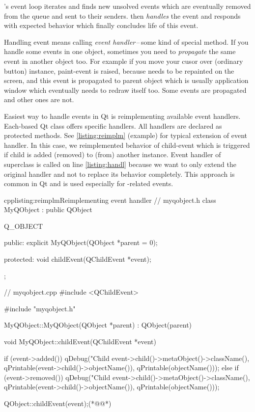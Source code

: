 \indent{}'s event loop iterates and finds new unsolved events which are eventually removed from the queue and sent to their senders. then \textit{handles} the event and responds with expected behavior which finally concludes life of this event.

Handling event means calling \textit{event handler}\,--\,some kind of special method. If you handle some events in one object, sometimes you need to \textit{propagate} the same event in another object too. For example if you move your cusor over (ordinary button) instance, paint-event is raised, because needs to be repainted on the screen, and this event is propagated to parent object which is usually application window which eventually needs to redraw itself too. Some events are propagated and other ones are not.

Easiest way to handle events in Qt is reimplementing available event handlers. Each-based Qt class offers specific handlers. All handlers are declared as protected methods. See \autoref{listing:reimplm} (example) for typical extension of event handler. In this case, we reimplemented behavior of child-event which is triggered if child is added (removed) to (from) another instance. Event handler of superclass is called on line \ref{listing:handl} because we want to only extend the original handler and not to replace its behavior completely. This approach is common in Qt and is used especially for -related events.

\begin{fdoccode}{cpp}{listing:reimplm}{Reimplementing event handler}
// myqobject.h
class MyQObject : public QObject{
	Q_OBJECT

    public:
		explicit MyQObject(QObject *parent = 0);

    protected:
		void childEvent(QChildEvent *event);
};

// myqobject.cpp
#include <QChildEvent>

#include "myqobject.h"


MyQObject::MyQObject(QObject *parent) : QObject(parent) {
}

void MyQObject::childEvent(QChildEvent *event) {
    if (event->added()) {
		qDebug("Child %
	       	event->child()->metaObject()->className(),
	       	qPrintable(event->child()->objectName()),
	       	qPrintable(objectName()));
    }
    else if (event->removed()) {
		qDebug("Child %
	       	event->child()->metaObject()->className(),
	       	qPrintable(event->child()->objectName()),
	       	qPrintable(objectName()));
    }

    QObject::childEvent(event);(*@\label{listing:handl}@*)
}
\end{fdoccode}

